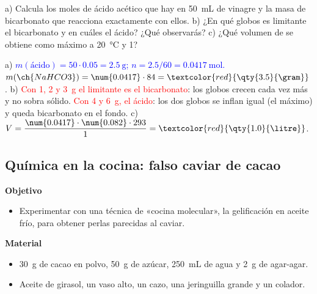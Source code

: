 \begin{exercise}
    a) Calcula los moles de ácido acético que hay en \qty{50}{\mL} de vinagre y la masa de bicarbonato que reacciona exactamente con
    ellos. b) ¿En qué globos es limitante el bicarbonato y en cuáles el ácido? ¿Qué observarás? c) ¿Qué volumen de  se
    obtiene como máximo a \qty{20}{\degreeCelsius} y \qty{1}{\atm}?
    \begin{solu}
        a) \textcolor{blue}{\(m(\text{ácido}) = 50 \cdot \num{0.05} = \qty{2.5}{\gram}\); \(n = \num{2.5}/60 = \qty{0.0417}{\mol}\).}
        \(m(\ch{NaHCO3}) = \num{0.0417} \cdot 84 = \textcolor{red}{\qty{3.5}{\gram}}\). b) \textcolor{red}{Con 1, 2 y \qty{3}{\gram}
        el limitante es el bicarbonato}: los globos crecen cada vez más y no sobra sólido. \textcolor{red}{Con 4 y \qty{6}{\gram}, el
        ácido}: los dos globos se inflan igual (el máximo) y queda bicarbonato en el fondo. c) \(V = \dfrac{\num{0.0417} \cdot
        \num{0.082} \cdot 293}{1} = \textcolor{red}{\qty{1.0}{\litre}}\).
    \end{solu}
\end{exercise}

\subsection{Química en la cocina: falso caviar de cacao}

\noindent\begin{minipage}[t]{0.48\textwidth}
    \textbf{Objetivo}
    \begin{itemize}
        \item Experimentar con una técnica de «cocina molecular», la gelificación en aceite frío, para obtener perlas parecidas al
        caviar.
    \end{itemize}
\end{minipage}\hfill
\begin{minipage}[t]{0.48\textwidth}
    \textbf{Material}
    \begin{itemize}
        \item \qty{30}{\gram} de cacao en polvo, \qty{50}{\gram} de azúcar, \qty{250}{\mL} de agua y \qty{2}{\gram} de agar-agar.
        \item Aceite de girasol, un vaso alto, un cazo, una jeringuilla grande y un colador.
    \end{itemize}
\end{minipage}


